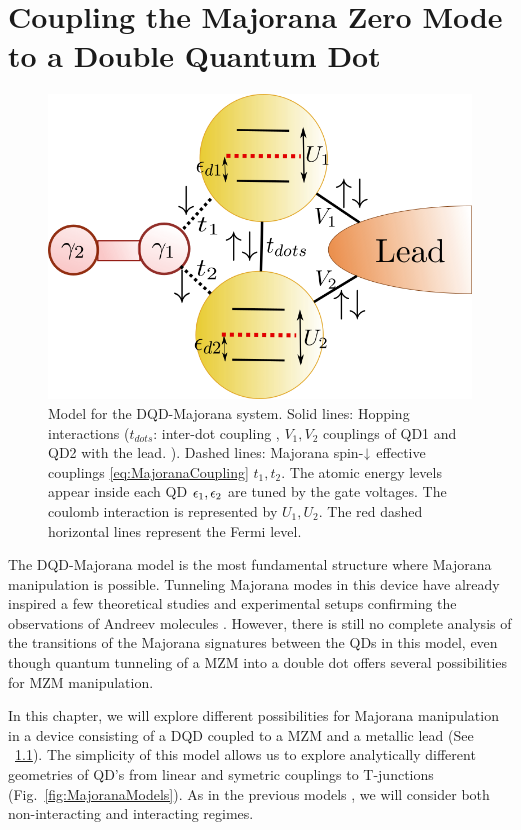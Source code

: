 \chapter{Coupling the Majorana Zero Mode to a Double Quantum Dot \label{chap:Results} }
\begin{figure}[hbt]
    \centering
    \includegraphics[scale=0.4]{IMAGES/GenModel.png}
    \caption{\label{fig:GenModel} Model for the DQD-Majorana system. Solid lines: Hopping interactions ($t_{dots}$: inter-dot coupling , $V_1,V_2$ couplings of QD1 and QD2 with the lead. ). Dashed lines: Majorana spin-$\downarrow$ effective couplings \eqref{eq:MajoranaCoupling} $t_1,t_2$. The atomic energy levels appear inside each QD $\epsilon_1, \epsilon_2$ are tuned by the gate voltages. The coulomb interaction is represented by $U_1,U_2$.  The red dashed horizontal lines represent the Fermi level. \protect \Source{ } } 
\end{figure}

\noindent The DQD-Majorana model is the most fundamental structure where Majorana manipulation is possible. Tunneling Majorana modes in this device have already inspired a few theoretical studies \cite{silva_andreev_2016,ivanov_coherent_2017} and experimental setups confirming the observations of Andreev molecules \cite{su_andreev_2017}. However, there is still no complete analysis of the transitions of the Majorana signatures between the QDs in this model, even though quantum tunneling of a MZM into a double dot offers several possibilities for MZM manipulation.  

 In this chapter, we will explore  different possibilities for Majorana manipulation in a device consisting of a DQD coupled to a MZM and a metallic lead (See \ \ref{fig:GenModel}). The simplicity of this model allows us to explore analytically different geometries of QD's from linear and symetric couplings to T-junctions (Fig.\ \ref{fig:MajoranaModels}). As in the previous models , we will consider both non-interacting and interacting regimes. 



